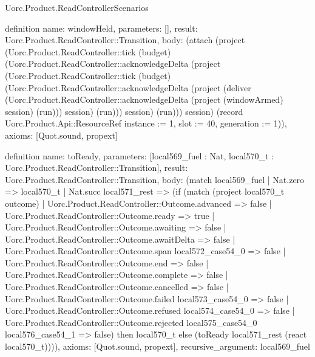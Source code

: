 \begin{lexlean}{Uorc.Product.ReadControllerScenarios}
\begin{semanticmodule}
definition{
  name: windowHeld,
  parameters: [],
  result: Uorc.Product.ReadController::Transition,
  body: (attach (project (Uorc.Product.ReadController::tick (budget) (Uorc.Product.ReadController::acknowledgeDelta (project (Uorc.Product.ReadController::tick (budget) (Uorc.Product.ReadController::acknowledgeDelta (project (deliver (Uorc.Product.ReadController::acknowledgeDelta (project (windowArmed) session) (run))) session) (run))) session) (run))) session) (record Uorc.Product.Api::ResourceRef {instance := 1, slot := 40, generation := 1})),
  axioms: [Quot.sound, propext]
}

definition{
  name: toReady,
  parameters: [local569_fuel : Nat, local570_t : Uorc.Product.ReadController::Transition],
  result: Uorc.Product.ReadController::Transition,
  body: (match local569_fuel
    | Nat.zero => local570_t
    | Nat.succ local571_rest => (if (match (project local570_t outcome)
      | Uorc.Product.ReadController::Outcome.advanced => false
      | Uorc.Product.ReadController::Outcome.ready => true
      | Uorc.Product.ReadController::Outcome.awaiting => false
      | Uorc.Product.ReadController::Outcome.awaitDelta => false
      | Uorc.Product.ReadController::Outcome.span local572_case54_0 => false
      | Uorc.Product.ReadController::Outcome.end => false
      | Uorc.Product.ReadController::Outcome.complete => false
      | Uorc.Product.ReadController::Outcome.cancelled => false
      | Uorc.Product.ReadController::Outcome.failed local573_case54_0 => false
      | Uorc.Product.ReadController::Outcome.refused local574_case54_0 => false
      | Uorc.Product.ReadController::Outcome.rejected local575_case54_0 local576_case54_1 => false) then local570_t else (toReady local571_rest (react local570_t)))),
  axioms: [Quot.sound, propext],
  recursive_argument: local569_fuel
}


\end{semanticmodule}
\end{lexlean}
